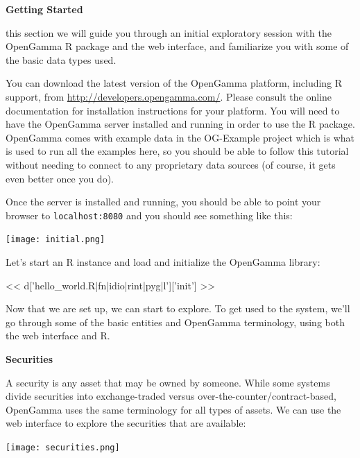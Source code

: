\documentclass[custom, plainsections]{sciposter}
\begin{document}
\begin{multicols*}{2}
\small

\textbf{Getting Started}
\label{sec:getting-started}

\vspace{0.5cm}

 this section we will guide you through an initial exploratory session with the OpenGamma R package and the web interface, and familiarize you with some of the basic data types used.

You can download the latest version of the OpenGamma platform, including R support, from \url{http://developers.opengamma.com/}. Please consult the online documentation for installation instructions for your platform. You will need to have the OpenGamma server installed and running in order to use the R package.  OpenGamma comes with example data in the OG-Example project which is what is used to run all the examples here, so you should be able to follow this tutorial without needing to connect to any proprietary data sources (of course, it gets even better once you do).

Once the server is installed and running, you should be able to point your browser to \verb|localhost:8080| and you should see something like this:

\vspace{0.5cm}
\texttt{[image: initial.png]}
\vspace{0.2cm}

Let's start an R instance and load and initialize the OpenGamma library:

<< d['hello_world.R|fn|idio|rint|pyg|l']['init'] >>

Now that we are set up, we can start to explore. To get used to the system, we'll go through some of the basic entities and OpenGamma terminology, using both the web interface and R.

\vspace{0.5cm}
\textbf{Securities}
\vspace{0.2cm}

A security is any asset that may be owned by someone. While some systems divide securities into exchange-traded versus over-the-counter/contract-based, OpenGamma uses the same terminology for all types of assets. We can use the web interface to explore the securities that are available:

\vspace{0.5cm}
\texttt{[image: securities.png]}

\vfill
\columnbreak


\end{multicols*}
\end{document}
